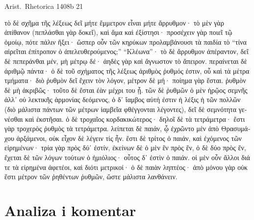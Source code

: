 Arist.\ Rhetorica 1408b 21


\medskip

{\large
\begin{greek}
  \noindent τὸ δὲ σχῆμα τῆς λέξεως δεῖ μήτε ἔμμετρον εἶναι μήτε ἄρρυθμον· τὸ μὲν γὰρ ἀπίθανον (πεπλάσθαι γὰρ δοκεῖ), καὶ ἅμα καὶ ἐξίστησι· προσέχειν γὰρ ποιεῖ τῷ ὁμοίῳ, πότε πάλιν ἥξει· ὥσπερ οὖν τῶν κηρύκων προλαμβάνουσι τὰ παιδία τὸ “τίνα αἱρεῖται ἐπίτροπον ὁ ἀπελευθερούμενος;” “Κλέωνα”· τὸ δὲ ἄρρυθμον ἀπέραντον, δεῖ δὲ πεπεράνθαι μέν, μὴ μέτρῳ δέ· ἀηδὲς γὰρ καὶ ἄγνωστον τὸ ἄπειρον. περαίνεται δὲ ἀριθμῷ πάντα· ὁ δὲ τοῦ σχήματος τῆς λέξεως ἀριθμὸς ῥυθμός ἐστιν, οὗ καὶ τὰ μέτρα τμήματα· διὸ ῥυθμὸν δεῖ ἔχειν τὸν λόγον, μέτρον δὲ μή· ποίημα γὰρ ἔσται. ῥυθμὸν δὲ μὴ ἀκριβῶς· τοῦτο δὲ ἔσται ἐὰν μέχρι του ᾖ. τῶν δὲ ῥυθμῶν ὁ μὲν ἡρῷος σεμνῆς ἀλλ᾽ οὐ λεκτικῆς ἁρμονίας δεόμενος, ὁ δ᾽ ἴαμβος αὐτή ἐστιν ἡ λέξις ἡ τῶν πολλῶν (διὸ μάλιστα πάντων τῶν μέτρων ἰαμβεῖα φθέγγονται λέγοντες), δεῖ δὲ σεμνότητα γενέσθαι καὶ ἐκστῆσαι. ὁ δὲ τροχαῖος κορδακικώτερος· δηλοῖ δὲ τὰ τετράμετρα· ἔστι γὰρ τροχερὸς ῥυθμὸς τὰ τετράμετρα. λείπεται δὲ παιάν, ᾧ ἐχρῶντο μὲν ἀπὸ Θρασυμάχου ἀρξάμενοι, οὐκ εἶχον δὲ λέγειν τίς ἦν. ἔστι δὲ τρίτος ὁ παιάν, καὶ ἐχόμενος τῶν εἰρημένων· τρία γὰρ πρὸς δύ᾽ ἐστίν, ἐκείνων δὲ ὁ μὲν ἓν πρὸς ἕν, ὁ δὲ δύο πρὸς ἕν, ἔχεται δὲ τῶν λόγων τούτων ὁ ἡμιόλιος· οὗτος δ᾽ ἐστὶν ὁ παιάν. οἱ μὲν οὖν ἄλλοι διά τε τὰ εἰρημένα ἀφετέοι, καὶ διότι μετρικοί· ὁ δὲ παιὰν ληπτέος· ἀπὸ μόνου γὰρ οὐκ ἔστι μέτρον τῶν ῥηθέντων ῥυθμῶν, ὥστε μάλιστα λανθάνειν.

\end{greek}
}

\newpage

\section*{Analiza i komentar}


